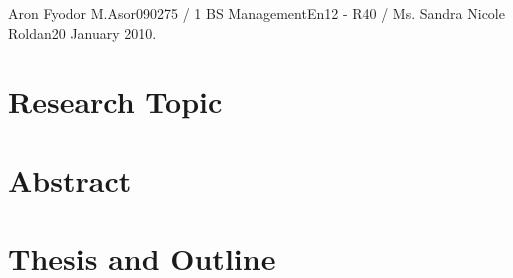 \documentclass[letterpaper]{article}
\begin{document}
\begin{mla}{Aron Fyodor M.}{Asor}{090275 / 1 BS Management}{En12 - R40 / Ms. Sandra Nicole Roldan}{20 January 2010}{. }






\section{Research Topic}
			

	
			
\section{Abstract}

			

\section{Thesis and Outline}
			






\end{mla}
\end{document}
